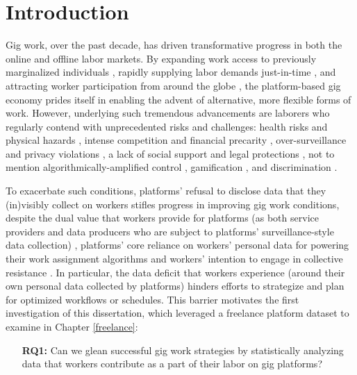 \chapter{Introduction}\label{ch:introduction}
Gig work, over the past decade, has driven transformative progress in both the online and offline labor markets. 
By expanding work access to previously marginalized individuals \cite{moving, disabled}, rapidly supplying labor demands just-in-time \cite{jit, making}, and attracting worker participation from around the globe \cite{woborders}, the platform-based gig economy prides itself in enabling the advent of alternative, more flexible forms of work. 
However, underlying such tremendous advancements are laborers who regularly contend with unprecedented risks and challenges: health risks and physical hazards \cite{body, health, technostress, Almoqbel2019-in}, intense competition and financial precarity \cite{dark, precarity, france, km}, over-surveillance and privacy violations \cite{surveillance, privacy}, a lack of social support and legal protections \cite{atom, category, employment}, not to mention algorithmically-amplified control \cite{locus, good}, gamification \cite{game, ludification}, and discrimination \cite{Leung2020-rk, Gelles-Watnick2021-fz, Rosenblat2017-bm}.

To exacerbate such conditions, platforms' refusal to disclose data that they (in)visibly collect on workers stifles progress in improving gig work conditions, despite the dual value that workers provide for platforms (as both service providers and data producers who are subject to platforms' surveillance-style data collection) \cite{dual}, platforms' core reliance on workers' personal data for powering their work assignment algorithms and workers' intention to engage in collective resistance \cite{boss}. In particular, the data deficit that workers experience (around their own personal data collected by platforms) hinders efforts to strategize and plan for optimized workflows or schedules. This barrier motivates the first investigation of this dissertation, which leveraged a freelance platform dataset to examine in Chapter \ref{freelance}:

\begin{enumerate}
    \item[\textbf{RQ1:}] Can we glean successful gig work strategies by statistically analyzing data that workers contribute as a part of their labor on gig platforms? \cite{personal} 
\end{enumerate}

